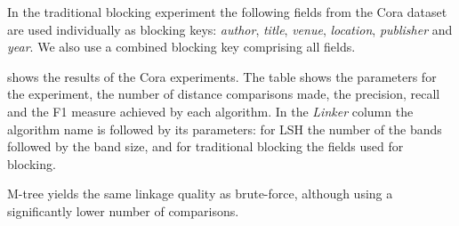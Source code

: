 \documentclass{llncs}
\begin{document}
In the traditional blocking experiment the following fields from the
Cora dataset are used individually as blocking keys: \textit{author},
\textit{title}, \textit{venue}, \textit{location}, \textit{publisher}
and \textit{year}. We also use a combined blocking key comprising all
fields.

 shows the results of the Cora
experiments. The table shows the parameters for the experiment, the
number of distance comparisons made, the precision, recall and the F1
measure achieved by each algorithm.  In the \emph{Linker} column the algorithm name is followed by its
parameters: for LSH the number of the bands followed by the band size, and for traditional blocking the fields used
for blocking.

M-tree yields the same linkage quality as brute-force, although using a significantly lower
number of comparisons.
\end{document}
